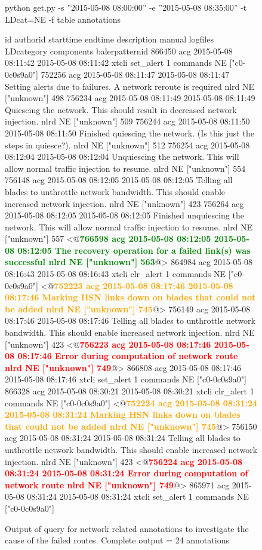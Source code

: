 \begin{figure*}
\begin{annol}
python get.py -s ''2015-05-08 08:00:00'' -e ''2015-05-08 08:35:00'' -t LDcat=NE -f table annotations

id	authorid	starttime	endtime	description	manual	logfiles	LDcategory	components	balerpatternid
866450	acg	2015-05-08 08:11:42	2015-05-08 08:11:42	xtcli set_alert	1	commands	NE	["c0-0c0s9a0"]
752256	acg	2015-05-08 08:11:47	2015-05-08 08:11:47	Setting alerts due to failures. A network reroute is required	nlrd	NE	["unknown"]	498
756234	acg	2015-05-08 08:11:49	2015-05-08 08:11:49	Quiescing the network. This should result in decreased network injection.	nlrd	NE	["unknown"]	509
756244	acg	2015-05-08 08:11:50	2015-05-08 08:11:50	Finished quiescing the network. (Is this just the steps in quiesce?).		nlrd	NE	["unknown"]	512
756254	acg	2015-05-08 08:12:04	2015-05-08 08:12:04	Unquiescing the network. This will allow normal traffic injection to resume.	nlrd	NE	["unknown"]	554
756148	acg	2015-05-08 08:12:05	2015-05-08 08:12:05	Telling all blades to unthrottle network bandwidth. This should enable increased network injection.	nlrd	NE	["unknown"]	423
756264	acg	2015-05-08 08:12:05	2015-05-08 08:12:05	Finished unquiescing the network. This will allow normal traffic injection to resume.	nlrd	NE	["unknown"]	557
<@\textbf{\textcolor{green}{766598	acg	2015-05-08 08:12:05	2015-05-08 08:12:05	The recovery operation for a failed link(s) was successful	nlrd	NE	["unknown"]	563}}@>
864984	acg	2015-05-08 08:16:43	2015-05-08 08:16:43	xtcli clr_alert	1	commands	NE	["c0-0c0s9a0"]
<@\textbf{\textcolor{orange}{752223	acg	2015-05-08 08:17:46	2015-05-08 08:17:46	Marking HSN links down on blades that could not be added	nlrd	NE	["unknown"]	745}}@>
756149	acg	2015-05-08 08:17:46	2015-05-08 08:17:46	Telling all blades to unthrottle network bandwidth. This should enable increased network injection.	nlrd	NE	["unknown"]	423
<@\textbf{\textcolor{red}{756223	acg	2015-05-08 08:17:46	2015-05-08 08:17:46	Error during computation of network route	nlrd	NE	["unknown"]	749}}@>
866808	acg	2015-05-08 08:17:46	2015-05-08 08:17:46	xtcli set_alert	1	commands	NE	["c0-0c0s9a0"]
866328	acg	2015-05-08 08:30:21	2015-05-08 08:30:21	xtcli clr_alert	1	commands	NE	["c0-0c0s9a0"]
<@\textbf{\textcolor{orange}{752224	acg	2015-05-08 08:31:24	2015-05-08 08:31:24	Marking HSN links down on blades that could not be added	nlrd	NE	["unknown"]	745}}@>
756150	acg	2015-05-08 08:31:24	2015-05-08 08:31:24	Telling all blades to unthrottle network bandwidth. This should enable increased network injection.	nlrd	NE	["unknown"]	423
<@\textbf{\textcolor{red}{756224	acg	2015-05-08 08:31:24	2015-05-08 08:31:24	Error during computation of network route	nlrd	NE	["unknown"]	749}}@>
865971	acg	2015-05-08 08:31:24	2015-05-08 08:31:24	xtcli set_alert	1	commands	NE	["c0-0c0s9a0"]
\end{annol}
\caption{Output of query for network related annotations to investigate the cause of the failed routes. Complete output = 24 annotations}
\label{f:routNEq}
\end{figure*}


